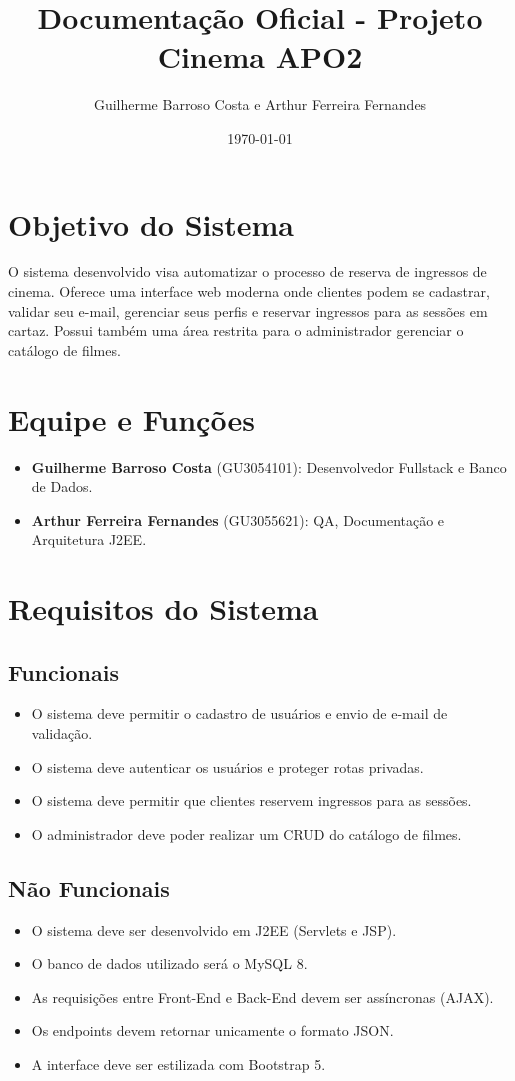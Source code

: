 \documentclass[12pt,a4paper]{article}
\title{\textbf{Documentação Oficial - Projeto Cinema APO2}}
\author{Guilherme Barroso Costa e Arthur Ferreira Fernandes}
\date{\today}
\begin{document}
\maketitle

\section{Objetivo do Sistema}
O sistema desenvolvido visa automatizar o processo de reserva de ingressos de cinema. Oferece uma interface web moderna onde clientes podem se cadastrar, validar seu e-mail, gerenciar seus perfis e reservar ingressos para as sessões em cartaz. Possui também uma área restrita para o administrador gerenciar o catálogo de filmes.

\section{Equipe e Funções}
\begin{itemize}
    \item \textbf{Guilherme Barroso Costa} (GU3054101): Desenvolvedor Fullstack e Banco de Dados.
    \item \textbf{Arthur Ferreira Fernandes} (GU3055621): QA, Documentação e Arquitetura J2EE.
\end{itemize}

\section{Requisitos do Sistema}
\subsection{Funcionais}
\begin{itemize}
    \item O sistema deve permitir o cadastro de usuários e envio de e-mail de validação.
    \item O sistema deve autenticar os usuários e proteger rotas privadas.
    \item O sistema deve permitir que clientes reservem ingressos para as sessões.
    \item O administrador deve poder realizar um CRUD do catálogo de filmes.
\end{itemize}

\subsection{Não Funcionais}
\begin{itemize}
    \item O sistema deve ser desenvolvido em J2EE (Servlets e JSP).
    \item O banco de dados utilizado será o MySQL 8.
    \item As requisições entre Front-End e Back-End devem ser assíncronas (AJAX).
    \item Os endpoints devem retornar unicamente o formato JSON.
    \item A interface deve ser estilizada com Bootstrap 5.
\end{itemize}
\end{document}
